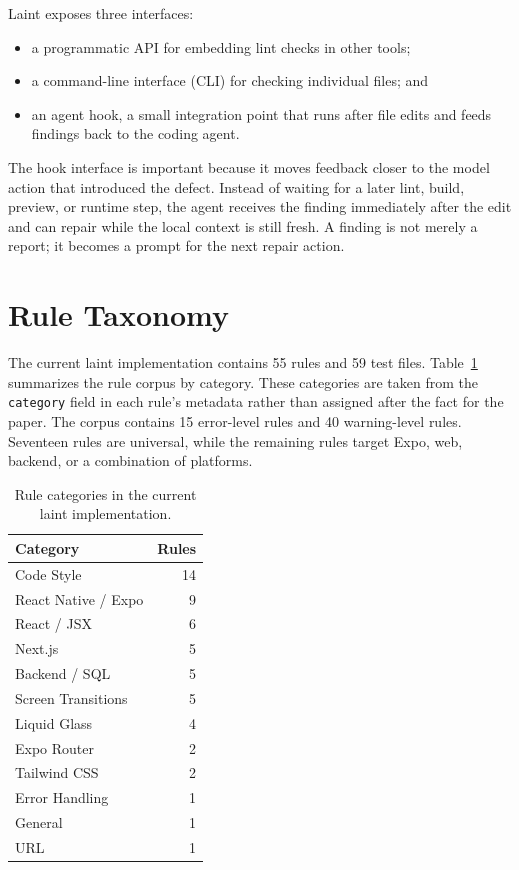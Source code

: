 \documentclass[11pt]{article}
\begin{document}
Laint exposes three interfaces:

\begin{itemize}
  \item a programmatic API for embedding lint checks in other tools;
  \item a command-line interface (CLI) for checking individual files; and
  \item an agent hook, a small integration point that runs after file edits and feeds findings back to the coding agent.
\end{itemize}

The hook interface is important because it moves feedback closer to the model action that introduced the defect. Instead of waiting for a later lint, build, preview, or runtime step, the agent receives the finding immediately after the edit and can repair while the local context is still fresh. A finding is not merely a report; it becomes a prompt for the next repair action.

\section{Rule Taxonomy}

The current laint implementation contains 55 rules and 59 test files. Table~\ref{tab:categories} summarizes the rule corpus by category. These categories are taken from the \texttt{category} field in each rule's metadata rather than assigned after the fact for the paper. The corpus contains 15 error-level rules and 40 warning-level rules. Seventeen rules are universal, while the remaining rules target Expo, web, backend, or a combination of platforms.

\begin{table}[!ht]
  \centering
  \begin{tabular}{lr}
    \toprule
    Category & Rules \\
    \midrule
    Code Style & 14 \\
    React Native / Expo & 9 \\
    React / JSX & 6 \\
    Next.js & 5 \\
    Backend / SQL & 5 \\
    Screen Transitions & 5 \\
    Liquid Glass & 4 \\
    Expo Router & 2 \\
    Tailwind CSS & 2 \\
    Error Handling & 1 \\
    General & 1 \\
    URL & 1 \\
    \bottomrule
  \end{tabular}
  \caption{Rule categories in the current laint implementation.}
  \label{tab:categories}
\end{table}
\end{document}
